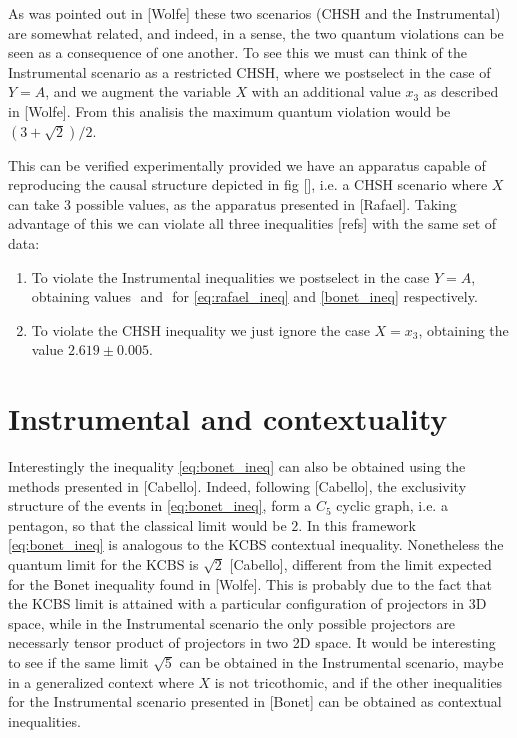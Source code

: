 \documentclass{article}
\begin{document}
As was pointed out in [Wolfe] these two scenarios (CHSH and the Instrumental)
are somewhat related, and indeed, in a sense, the two quantum violations can be
seen as a consequence of one another.
To see this we must can think of the Instrumental scenario as a restricted CHSH,
where we postselect in the case of $Y = A$, and we augment the variable $X$ with
an additional value $x_3$ as described in [Wolfe].
From this analisis the maximum quantum violation would be $(3 + \sqrt{2})/2$.

This can be verified experimentally provided we have an apparatus capable of
reproducing the causal structure depicted in fig [], i.e. a CHSH scenario
where $X$ can take 3 possible values, as the apparatus presented in [Rafael].
Taking advantage of this we can violate all three inequalities [refs] with the same set of
data:
\begin{enumerate}
    \item To violate the Instrumental inequalities we postselect in the case
        $Y = A$, obtaining values $ $ and $ $ for \eqref{eq:rafael_ineq} and
        \eqref{bonet_ineq} respectively.
    \item To violate the CHSH inequality we just ignore the case $X = x_3$,
        obtaining the value $2.619 \pm 0.005$.
\end{enumerate}

\section*{Instrumental and contextuality}
Interestingly the inequality \eqref{eq:bonet_ineq} can also be obtained using
the methods presented in [Cabello].
Indeed, following [Cabello], the exclusivity structure of the events in
\eqref{eq:bonet_ineq}, form a $C_5$ cyclic graph, i.e. a pentagon, so that the
classical limit would be $2$.
In this framework \eqref{eq:bonet_ineq} is analogous to the KCBS contextual
inequality.
Nonetheless the quantum limit for the KCBS is $\sqrt{2}$ [Cabello], different
from the limit expected for the Bonet inequality found in [Wolfe].
This is probably due to the fact that the KCBS limit is attained with a
particular configuration of projectors in 3D space, while in the
Instrumental scenario the only possible projectors are necessarly tensor product of
projectors in two 2D space.
It would be interesting to see if the same limit $\sqrt{5}$ can be obtained in the
Instrumental scenario, maybe in a generalized context where $X$ is not
tricothomic, and if the other inequalities for the Instrumental scenario
presented in [Bonet] can be obtained as contextual inequalities.
\end{document}
